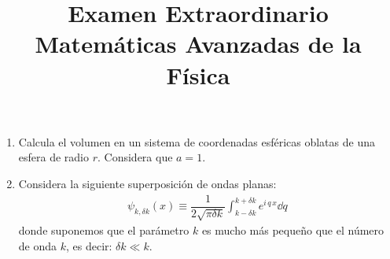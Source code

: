 
\author{}
\title{Examen Extraordinario\\ \large{Matemáticas Avanzadas de la Física} \vspace{-50pt}}
\date{}

\renewcommand\labelenumii{\theenumi.{\arabic{enumii})}}
\maketitle
\fontsize{14}{14}\selectfont
\begin{enumerate}
\item Calcula el volumen en un sistema de coordenadas esféricas oblatas de una esfera de radio $r$. Considera que $a = 1$.
\item Considera la siguiente superposición de ondas planas:
\begin{align*}
\psi_{k, \delta k} (x) \equiv \dfrac{1}{2 \sqrt{\pi \delta k}} \int_{k -\delta k}^{k + \delta k} e^{i \, q \, x} \dd{q}
\end{align*}
donde suponemos que el parámetro $k$ es mucho más pequeño que el número de onda $k$, es decir: $\delta k \ll k$.


\end{enumerate}
